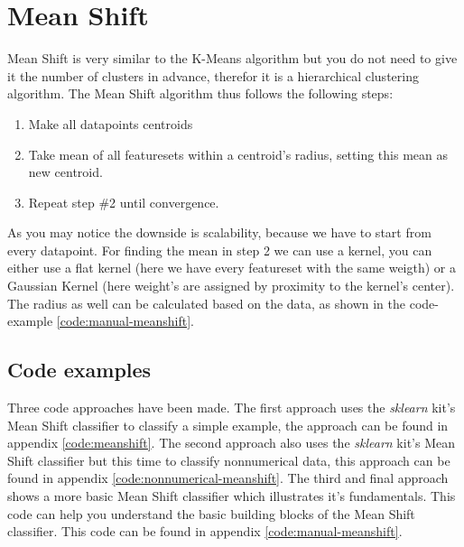 \section{Mean Shift}
Mean Shift is very similar to the K-Means algorithm but you do not need to give it the number of clusters in advance, therefor it is a hierarchical clustering algorithm. The Mean Shift algorithm thus follows the following steps:

\begin{enumerate}
\item Make all datapoints centroids
\item Take mean of all featuresets within a centroid's radius, setting this mean as new centroid.
\item Repeat step \#2 until convergence.
\end{enumerate}

\noindent As you may notice the downside is scalability, because we have to start from every datapoint. For finding the mean in step 2 we can use a kernel, you can either use a flat kernel (here we have every featureset with the same weigth) or a Gaussian Kernel (here weight's are assigned by proximity to the kernel's center). The radius as well can be calculated based on the data, as shown in the code-example \ref{code:manual-meanshift}.

\subsection{Code examples}
Three code approaches have been made. The first approach uses the \emph{sklearn} kit's Mean Shift classifier to classify a simple example, the approach can be found in appendix \ref{code:meanshift}. The second approach also uses the \emph{sklearn} kit's Mean Shift classifier but this time to classify nonnumerical data, this approach can be found in appendix \ref{code:nonnumerical-meanshift}. The third and final approach shows a more basic Mean Shift classifier which illustrates it's fundamentals. This code can help you understand the basic building blocks of the Mean Shift classifier.  This code can be found in appendix \ref{code:manual-meanshift}.
